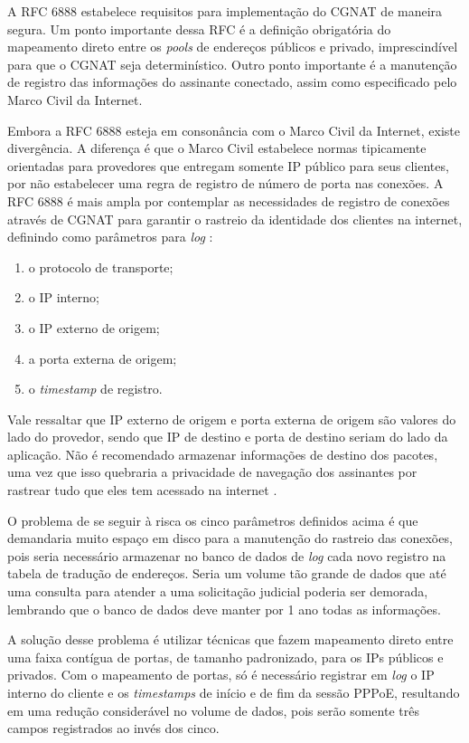    A RFC 6888 estabelece requisitos para implementação do CGNAT de maneira segura. Um ponto importante dessa RFC é a definição obrigatória do mapeamento direto entre os \textit{pools} de endereços públicos e privado, imprescindível para que o CGNAT seja determinístico. Outro ponto importante é a manutenção de registro das informações do assinante conectado, assim como especificado pelo Marco Civil da Internet.
   
   Embora a RFC 6888 esteja em consonância com o Marco Civil da Internet, existe divergência. A diferença é que o Marco Civil estabelece normas tipicamente orientadas para provedores que entregam somente IP público para seus clientes, por não estabelecer uma regra de registro de número de porta nas conexões. A RFC 6888 é mais ampla por contemplar as necessidades de registro de conexões através de CGNAT para garantir o rastreio da identidade dos clientes na internet, definindo como parâmetros para \textit{log} \cite{rfc6888}:
   
   \begin{enumerate}[label=\alph*)]
       \item o protocolo de transporte;
       \item o IP interno;
       \item o IP externo de origem;
       \item a porta externa de origem;
       \item o \textit{timestamp} de registro.
   \end{enumerate}

   Vale ressaltar que IP externo de origem e porta externa de origem são valores do lado do provedor, sendo que IP de destino e porta de destino seriam do lado da aplicação. Não é recomendado armazenar informações de destino dos pacotes, uma vez que isso quebraria a privacidade de navegação dos assinantes por rastrear tudo que eles tem acessado na internet \cite{rfc6888}.

   O problema de se seguir à risca os cinco parâmetros definidos acima é que demandaria muito espaço em disco para a manutenção do rastreio das conexões, pois seria necessário armazenar no banco de dados de \textit{log} cada novo registro na tabela de tradução de endereços. Seria um volume tão grande de dados que até uma consulta para atender a uma solicitação judicial poderia ser demorada, lembrando que o banco de dados deve manter por 1 ano todas as informações.

   A solução desse problema é utilizar técnicas que fazem mapeamento direto entre uma faixa contígua de portas, de tamanho padronizado, para os IPs públicos e privados. Com o mapeamento de portas, só é necessário registrar em \textit{log} o IP interno do cliente e os \textit{timestamps} de início e de fim da sessão PPPoE, resultando em uma redução considerável no volume de dados, pois serão somente três campos registrados ao invés dos cinco. 
 
